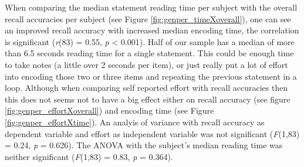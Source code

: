 \documentclass[a4paper,man,natbib,floatsintext,import]{apa6}
\begin{document}
When comparing the median statement reading time per subject with the overall recall accuracies per subject (see Figure \ref{fig:genper_timeXoverall}), one can see an improved recall accuracy with increased median encoding time, the correlation is significant (\textit{r}(83) = 0.55, \textit{p} < 0.001). Half of our sample has a median of more than 6.5 seconds reading time for a single statement. This could be enough time to take notes (a little over 2 seconds per item), or just really put a lot of effort into encoding those two or three items and repeating the previous statement in a loop. Although when comparing self reported effort with recall accuracies then this does not seems not to have a big effect either on recall accuracy (see figure \ref{fig:genper_effortXoverall}) and encoding time (see Figure \ref{fig:genper_effortXtime}). An analyis of variance with recall accuracy as dependent variable and effort as independent variable was not significant (\textit{F}(1,83) = 0.24, \textit{p} = 0.626). The ANOVA with the subject's median reading time was neither significant (\textit{F}(1,83) = 0.83, \textit{p} = 0.364).

\end{document}
